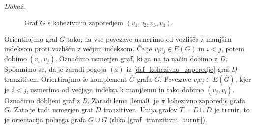 \documentclass[a4paper, 12pt]{book}
\newenvironment{dokaz}{\emph{Dokaz.}\ }{\hspace{\fill}{$\Box$}}
\begin{document}
\begin{dokaz}
\begin{figure}[h]
\begin{center}
        \end{center}
        \caption{Graf $G$ s kohezivnim zaporedjem $(v_1, v_2, v_3, v_4)$.}
        \label{graf_s_kohezivnim_zaporedjem}
    \end{figure}
    Orientirajmo graf $G$ tako, da vse povezave usmerimo od vozlišča z manjšim indeksom proti vozlišču z večjim indeksom. Če je $v_iv_j \in E(G)$ in $i < j$, potem dobimo $(v_i, v_j)$. Označimo usmerjen graf, ki ga na ta način dobimo z $D$. Spomnimo se, da je zaradi pogoja $(a)$ iz \ref{def_kohezivno_zaporedje} graf $D$ tranzitiven. Orientirajmo še komplement $\overline{G}$ grafa $G$. Povezave $v_iv_j \in E(\overline{G})$, kjer je $i < j$, usmerimo od večjega indeksa k manjšemu in tako dobimo $(v_j, v_i)$. Označimo dobljeni graf z $\overline{D}$. Zaradi leme \ref{lema0} je $\pi$ kohezivno zaporedje grafa $\overline{G}$. Zato je tudi usmerjen graf $\overline{D}$ tranzitiven. Unija grafov $T = D \cup \overline{D}$ je turnir, to je orientacija polnega grafa $G \cup \overline{G}$ (slika \ref{graf_tranzitivni_turnir}).
    \begin{figure}[h]
        \begin{center}
\end{center}
\end{figure}
\end{dokaz}
\end{document}
